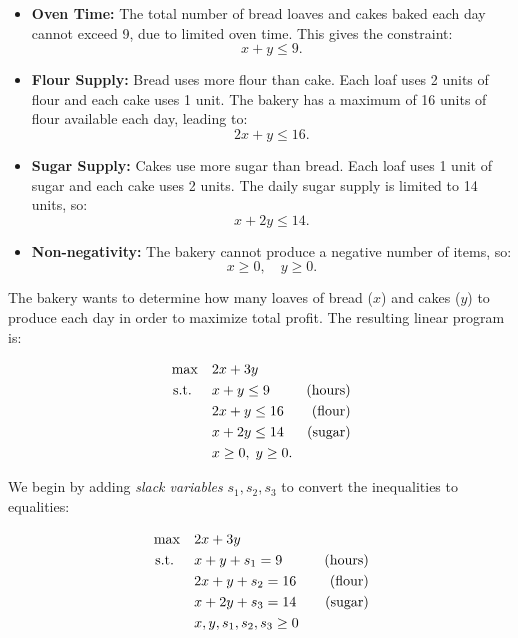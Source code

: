 \begin{itemize}
    \item \textbf{Oven Time:} The total number of bread loaves and cakes baked each day cannot exceed 9, due to limited oven time. This gives the constraint:
    \[
    x + y \leq 9.
    \]
    
    \item \textbf{Flour Supply:} Bread uses more flour than cake. Each loaf uses 2 units of flour and each cake uses 1 unit. The bakery has a maximum of 16 units of flour available each day, leading to:
    \[
    2x + y \leq 16.
    \]
    
    \item \textbf{Sugar Supply:} Cakes use more sugar than bread. Each loaf uses 1 unit of sugar and each cake uses 2 units. The daily sugar supply is limited to 14 units, so:
    \[
    x + 2y \leq 14.
    \]

    \item \textbf{Non-negativity:} The bakery cannot produce a negative number of items, so:
    \[
    x \geq 0, \quad y \geq 0.
    \]
\end{itemize}


The bakery wants to determine how many loaves of bread (\(x\)) and cakes (\(y\)) to produce each day in order to maximize total profit. The resulting linear program is:

\begin{tcolorbox}[colback=orange!5!white, colframe=orange!75!black,    
    width=0.6\textwidth, %
    box align=center, 
    title=\textbf{Original Linear Program}]
\[
\begin{aligned}
\max \quad & 2x + 3y \\
\mbox{ s.t. } \quad 
& x + y \leq 9  & \mbox{(hours)}\\
& 2x + y \leq 16  & \mbox{(flour)}\\
& x + 2y \leq 14 & \mbox{(sugar)}\\
& x \geq 0,\; y \geq 0.
\end{aligned}
\]
\end{tcolorbox}

We begin by adding \emph{slack variables} \( s_1, s_2, s_3 \) to convert the inequalities to equalities:

\begin{tcolorbox}[colback=gray!5!white, colframe=gray!75!black,    
    width=0.6\textwidth, %
    box align=center, 
    title=\textbf{Standard Form}]
\[
\begin{aligned}
\max \quad & 2x + 3y \\
\mbox{ s.t. } \quad 
&x + y + s_1 = 9 \quad &\mbox{(hours)} \\
&2x + y + s_2 = 16 \quad &\mbox{(flour)} \\
&x + 2y + s_3 = 14 \quad &\mbox{(sugar)} \\
&x, y, s_1, s_2, s_3 \geq 0
\end{aligned}
\]
\end{tcolorbox}

